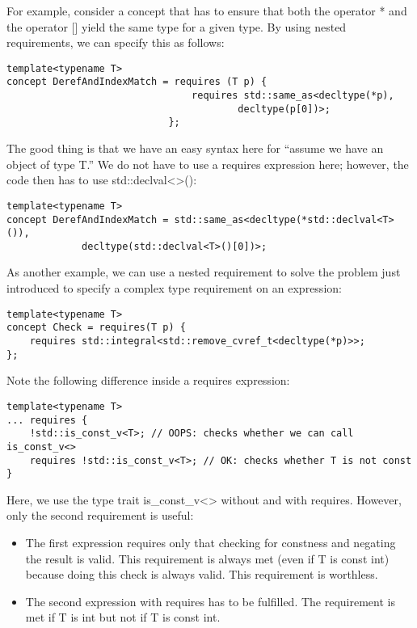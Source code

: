 For example, consider a concept that has to ensure that both the operator * and the operator [] yield the same type for a given type. By using nested requirements, we can specify this as follows:

\begin{lstlisting}[style=styleCXX]
template<typename T>
concept DerefAndIndexMatch = requires (T p) {
								requires std::same_as<decltype(*p),
										decltype(p[0])>;
							};
\end{lstlisting}

The good thing is that we have an easy syntax here for “assume we have an object of type T.” We do not have to use a requires expression here; however, the code then has to use std::declval<>():

\begin{lstlisting}[style=styleCXX]
template<typename T>
concept DerefAndIndexMatch = std::same_as<decltype(*std::declval<T>()),
			 decltype(std::declval<T>()[0])>;
\end{lstlisting}

As another example, we can use a nested requirement to solve the problem just introduced to specify a complex type requirement on an expression:

\begin{lstlisting}[style=styleCXX]
template<typename T>
concept Check = requires(T p) {
	requires std::integral<std::remove_cvref_t<decltype(*p)>>;
};
\end{lstlisting}

Note the following difference inside a requires expression:

\begin{lstlisting}[style=styleCXX]
template<typename T>
... requires {
	!std::is_const_v<T>; // OOPS: checks whether we can call is_const_v<>
	requires !std::is_const_v<T>; // OK: checks whether T is not const
}
\end{lstlisting}

Here, we use the type trait is\_const\_v<> without and with requires. However, only the second requirement is useful:

\begin{itemize}
\item
The first expression requires only that checking for constness and negating the result is valid. This requirement is always met (even if T is const int) because doing this check is always valid. This requirement is worthless.

\item
The second expression with requires has to be fulfilled. The requirement is met if T is int but not if T is const int.
\end{itemize}

